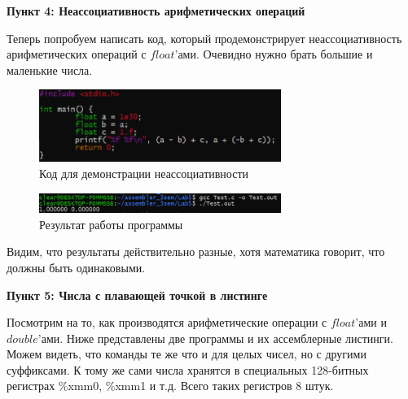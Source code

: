 \documentclass[a4paper,12pt]{article}
\begin{document}
\textbf{Пункт 4: Неассоциативность арифметических операций}

Теперь попробуем написать код, который продемонстрирует неассоциативность арифметических операций с $float$'ами. Очевидно нужно брать большие и маленькие числа. 
\begin{figure}[H]\label{fig: antiAssociation code}
    \centering
    \includegraphics[width=0.7\textwidth]{Неассоциативность вставка.png}
    \caption{Код для демонстрации неассоциативности}
\end{figure}

\begin{figure}[H]\label{fig: antiAssociation result}
    \centering
    \includegraphics[width=0.7\textwidth]{Неассоциативность результат.png}
    \caption{Результат работы программы}
\end{figure}
Видим, что результаты действительно разные, хотя математика говорит, что должны быть одинаковыми. 

\textbf{Пункт 5: Числа с плавающей точкой в листинге}

Посмотрим на то, как производятся арифметические операции с $float$'ами и $double$'ами. Ниже представлены две программы и их ассемблерные листинги. Можем видеть, что команды те же что и для целых чисел, но с другими суффиксами. К тому же сами числа хранятся в специальных 128-битных регистрах \%xmm0, \%xmm1 и т.д. Всего таких регистров 8 штук. 
\end{document}
